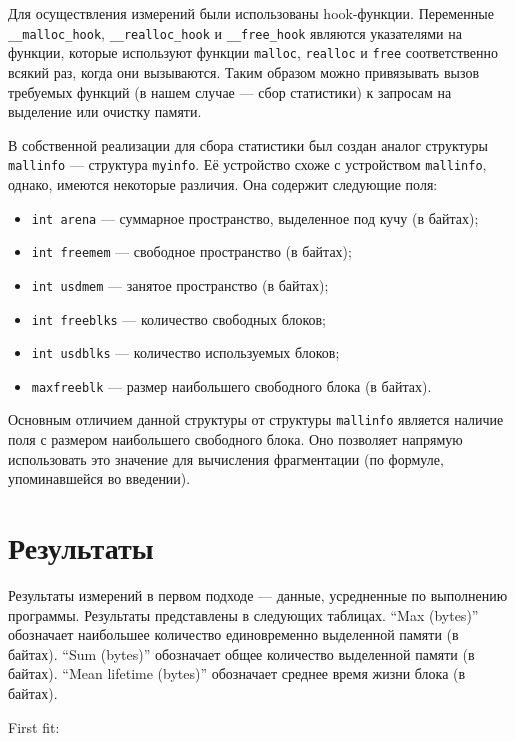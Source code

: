 Для осуществления измерений были использованы hook-функции. Переменные \texttt{\_\_malloc\_hook}, \texttt{\_\_realloc\_hook} 
и \texttt{\_\_free\_hook} являются указателями на функции, которые используют функции \texttt{malloc}, \texttt{realloc} и \texttt{free} 
соответственно всякий раз, когда они вызываются. Таким образом можно привязывать вызов требуемых функций (в нашем случае --- 
сбор статистики) к запросам на выделение или очистку памяти.
   
В собственной реализации для сбора статистики был создан аналог структуры \texttt{mallinfo} --- структура \texttt{myinfo}.
Её устройство схоже с устройством \texttt{mallinfo}, однако, имеются некоторые различия. Она содержит следующие поля:

\begin{itemize}
\item \texttt{int arena} --- суммарное пространство, выделенное под кучу (в байтах);
\item \texttt{int freemem} --- свободное пространство (в байтах);
\item \texttt{int usdmem} --- занятое пространство (в байтах);
\item \texttt{int freeblks} --- количество свободных блоков;
\item \texttt{int usdblks} --- количество используемых блоков;
\item \texttt{maxfreeblk} --- размер наибольшего свободного блока (в байтах).
\end{itemize} 
   
Основным отличием данной структуры от структуры \texttt{mallinfo} является наличие поля с размером наибольшего свободного
блока. Оно позволяет напрямую использовать это значение для вычисления фрагментации (по формуле, упоминавшейся
во введении).
   
   
\section{Результаты}
   
Результаты измерений в первом подходе --- данные, усредненные по выполнению программы. Результаты представлены в следующих 
таблицах. ``Max (bytes)'' обозначает наибольшее количество единовременно выделенной памяти (в байтах). ``Sum (bytes)''
 обозначает общее количество выделенной памяти (в байтах). ``Mean lifetime (bytes)'' обозначает среднее время жизни блока
(в байтах).
    
    First fit:

